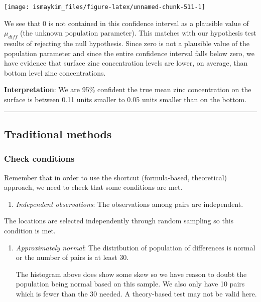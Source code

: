 \documentclass[12pt,]{krantz}
\providecommand{\tightlist}{%
  \setlength{\itemsep}{0pt}\setlength{\parskip}{0pt}}
\begin{document}
\begin{center}\texttt{[image: ismaykim\_files/figure-latex/unnamed-chunk-511-1]} \end{center}

We see that 0 is not contained in this confidence interval as a
plausible value of \(\mu_{diff}\) (the unknown population parameter).
This matches with our hypothesis test results of rejecting the null
hypothesis. Since zero is not a plausible value of the population
parameter and since the entire confidence interval falls below zero, we
have evidence that surface zinc concentration levels are lower, on
average, than bottom level zinc concentrations.

\textbf{Interpretation}: We are 95\% confident the true mean zinc
concentration on the surface is between 0.11 units smaller to 0.05 units
smaller than on the bottom.

\begin{center}\rule{0.5\linewidth}{\linethickness}\end{center}

\subsection{Traditional methods}\label{traditional-methods-4}

\subsubsection*{Check conditions}\label{check-conditions-4}


Remember that in order to use the shortcut (formula-based, theoretical)
approach, we need to check that some conditions are met.

\begin{enumerate}
\def\labelenumi{\arabic{enumi}.}
\tightlist
\item
  \emph{Independent observations}: The observations among pairs are
  independent.
\end{enumerate}

The locations are selected independently through random sampling so this
condition is met.

\begin{enumerate}
\def\labelenumi{\arabic{enumi}.}
\setcounter{enumi}{1}
\item
  \emph{Approximately normal}: The distribution of population of
  differences is normal or the number of pairs is at least 30.

  The histogram above does show some skew so we have reason to doubt the
  population being normal based on this sample. We also only have 10
  pairs which is fewer than the 30 needed. A theory-based test may not
  be valid here.
\end{enumerate}
\end{document}
